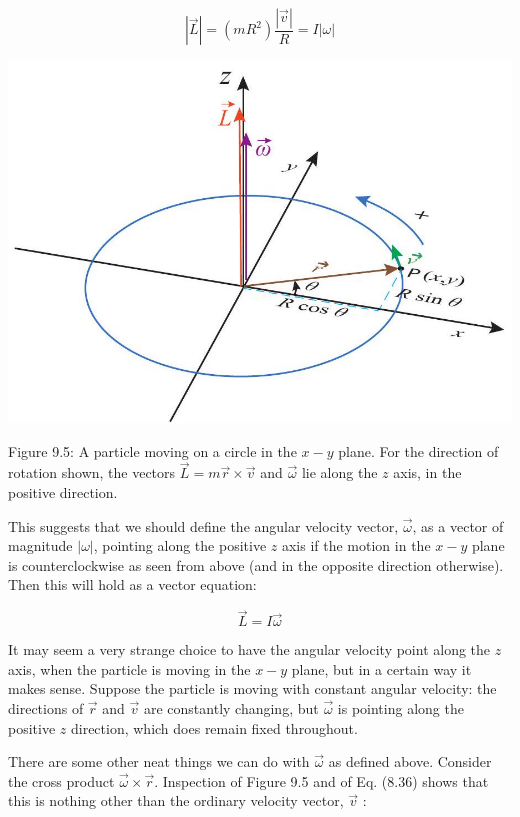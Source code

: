 \documentclass[10pt]{article}
\begin{document}
\begin{equation*}
|\vec{L}|=\left(m R^{2}\right) \frac{|\vec{v}|}{R}=I|\omega| \tag{9.12}
\end{equation*}


\begin{center}
\includegraphics[max width=\textwidth]{2024_09_14_9969b06773f10b6936e8g-217}
\end{center}

Figure 9.5: A particle moving on a circle in the $x-y$ plane. For the direction of rotation shown, the vectors $\vec{L}=m \vec{r} \times \vec{v}$ and $\vec{\omega}$ lie along the $z$ axis, in the positive direction.

This suggests that we should define the angular velocity vector, $\vec{\omega}$, as a vector of magnitude $|\omega|$, pointing along the positive $z$ axis if the motion in the $x-y$ plane is counterclockwise as seen from above (and in the opposite direction otherwise). Then this will hold as a vector equation:


\begin{equation*}
\vec{L}=I \vec{\omega} \tag{9.13}
\end{equation*}


It may seem a very strange choice to have the angular velocity point along the $z$ axis, when the particle is moving in the $x-y$ plane, but in a certain way it makes sense. Suppose the particle is moving with constant angular velocity: the directions of $\vec{r}$ and $\vec{v}$ are constantly changing, but $\vec{\omega}$ is pointing along the positive $z$ direction, which does remain fixed throughout.

There are some other neat things we can do with $\vec{\omega}$ as defined above. Consider the cross product $\vec{\omega} \times \vec{r}$. Inspection of Figure 9.5 and of Eq. (8.36) shows that this is nothing other than the ordinary velocity vector, $\vec{v}$ :
\end{document}
